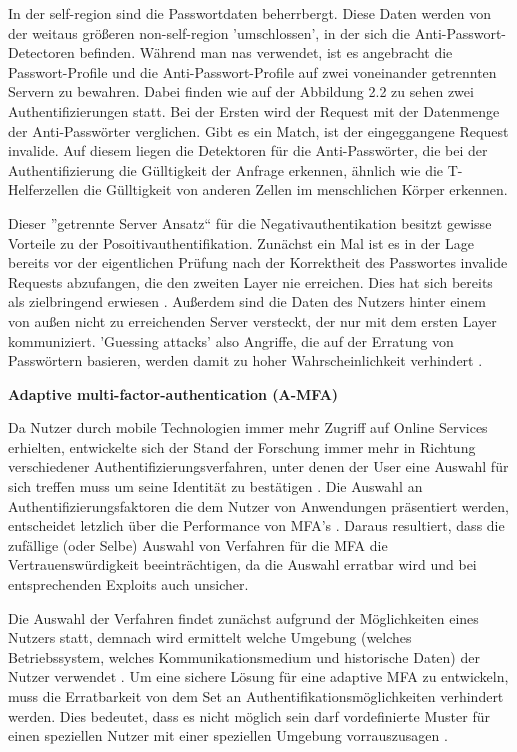 In der self-region sind die Passwortdaten beherrbergt. Diese Daten werden von der weitaus größeren non-self-region 'umschlossen', in der sich die Anti-Passwort-Detectoren befinden.
Während man \ac{nas} verwendet, ist es angebracht die Passwort-Profile und die Anti-Passwort-Profile auf zwei voneinander getrennten Servern zu bewahren. Dabei finden wie auf der Abbildung 2.2 zu sehen zwei Authentifizierungen statt. Bei der Ersten wird der Request mit der Datenmenge der Anti-Passwörter verglichen. Gibt es ein Match, ist der eingeggangene Request invalide. Auf diesem liegen die Detektoren für die Anti-Passwörter, die bei der Authentifizierung die Gülltigkeit der Anfrage erkennen, ähnlich wie die T-Helferzellen die Gülltigkeit von anderen Zellen im menschlichen Körper erkennen.

Dieser ''getrennte Server Ansatz`` für die Negativauthentikation besitzt gewisse Vorteile zu der Posoitivauthentifikation. Zunächst ein Mal ist es in der Lage bereits vor der eigentlichen Prüfung nach der Korrektheit des Passwortes invalide Requests abzufangen, die den zweiten Layer nie erreichen. Dies hat sich bereits als zielbringend erwiesen \cite{A14}. Außerdem sind die Daten des Nutzers hinter einem von außen nicht zu erreichenden Server versteckt, der nur mit dem ersten Layer kommuniziert. 'Guessing attacks' also Angriffe, die auf der Erratung von Passwörtern basieren, werden damit zu hoher Wahrscheinlichkeit verhindert \cite{A11}.

\textbf{Adaptive multi-factor-authentication (A-MFA)}

Da Nutzer durch mobile Technologien immer mehr Zugriff auf Online Services erhielten, entwickelte sich der Stand der Forschung immer mehr in Richtung verschiedener Authentifizierungsverfahren, unter denen der User eine Auswahl für sich treffen muss um seine Identität zu bestätigen \cite{A11}. Die Auswahl an Authentifizierungsfaktoren die dem Nutzer von Anwendungen präsentiert werden, entscheidet letzlich über die Performance von MFA's \cite{A11}. Daraus resultiert, dass die zufällige (oder Selbe) Auswahl von Verfahren für die MFA die Vertrauenswürdigkeit beeinträchtigen, da die Auswahl erratbar wird und bei entsprechenden Exploits auch unsicher. 

Die Auswahl der Verfahren findet zunächst aufgrund der Möglichkeiten eines Nutzers statt, demnach wird ermittelt welche Umgebung (welches Betriebssystem, welches Kommunikationsmedium und historische Daten) der Nutzer verwendet \cite{A15}. Um eine sichere Lösung für eine adaptive MFA zu entwickeln, muss die Erratbarkeit von dem Set an Authentifikationsmöglichkeiten verhindert werden. Dies bedeutet, dass es nicht möglich sein darf vordefinierte Muster für einen speziellen Nutzer mit einer speziellen Umgebung vorrauszusagen \cite{11}.

